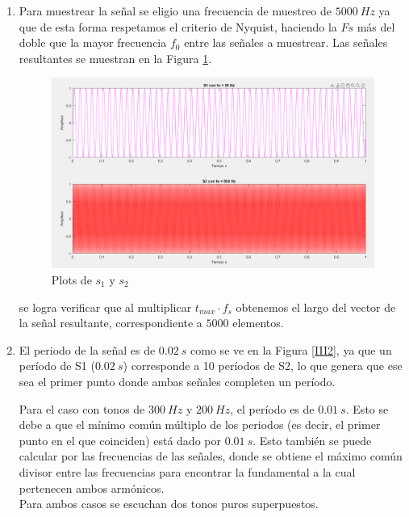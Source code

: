 \documentclass[letterpaper,onecolumn,10pt,journal,final]{IEEEtran}
\begin{document}
\begin{enumerate}[{1)}]
    \item Para muestrear la señal se eligio una frecuencia de muestreo de $5000~Hz$ ya que de esta forma respetamos el criterio de Nyquist, haciendo la $Fs$ más del doble que la mayor frecuencia $f_0$ entre las señales a muestrear. Las señales resultantes se muestran en la Figura \ref{III1}.
    \begin{figure}[H]
    \centering
    \includegraphics[scale=0.5]{Figuras/plotIII1.png}
    \caption{Plots de $s_1$ y $s_2$}\label{III1}
    \end{figure}
    se logra verificar que al multiplicar $t_{max} \cdot f_s$ obtenemos el largo del vector de la señal resultante, correspondiente a $5000$ elementos.
    \item El periodo de la señal es de $0.02~s$ como se ve en la Figura \ref{III2}, ya que un período de S1 ($0.02~s$) corresponde a 10 períodos de S2, lo que genera que ese sea el primer punto donde ambas señales completen un período.
    
    Para el caso con tonos de $300~Hz$ y $200~Hz$, el período es de $0.01~s$. Esto se debe a que el mínimo común múltiplo de los periodos (es decir, el primer punto en el que coinciden) está dado por $0.01~s$. Esto también se puede calcular por las frecuencias de las señales, donde se obtiene el máximo común divisor entre las frecuencias para encontrar la fundamental a la cual pertenecen ambos armónicos.  \\
    Para ambos casos se escuchan dos tonos puros superpuestos.\\
    

\end{enumerate}
\end{document}
